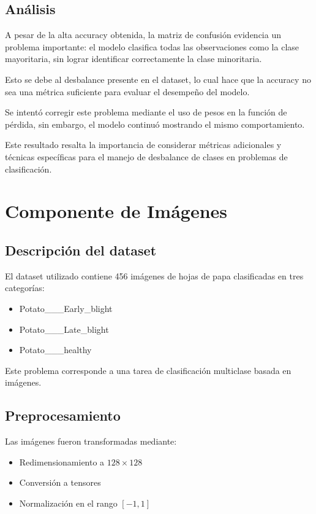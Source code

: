 \documentclass{article}
\begin{document}
\subsection{Análisis}

A pesar de la alta accuracy obtenida, la matriz de confusión evidencia un problema importante: el modelo clasifica todas las observaciones como la clase mayoritaria, sin lograr identificar correctamente la clase minoritaria.

Esto se debe al desbalance presente en el dataset, lo cual hace que la accuracy no sea una métrica suficiente para evaluar el desempeño del modelo.

Se intentó corregir este problema mediante el uso de pesos en la función de pérdida, sin embargo, el modelo continuó mostrando el mismo comportamiento.

Este resultado resalta la importancia de considerar métricas adicionales y técnicas específicas para el manejo de desbalance de clases en problemas de clasificación.

\section{Componente de Imágenes}

\subsection{Descripción del dataset}

El dataset utilizado contiene 456 imágenes de hojas de papa clasificadas en tres categorías:

\begin{itemize}
    \item Potato\_\_\_Early\_blight
    \item Potato\_\_\_Late\_blight
    \item Potato\_\_\_healthy
\end{itemize}

Este problema corresponde a una tarea de clasificación multiclase basada en imágenes.

\subsection{Preprocesamiento}

Las imágenes fueron transformadas mediante:

\begin{itemize}
    \item Redimensionamiento a $128 \times 128$
    \item Conversión a tensores
    \item Normalización en el rango $[-1,1]$
\end{itemize}
\end{document}
